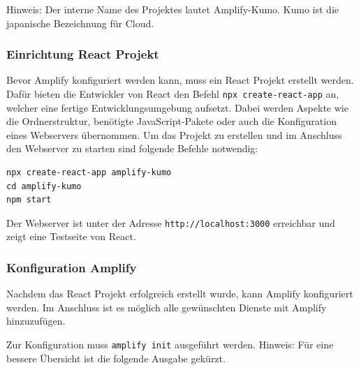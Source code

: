 Hinweis: Der interne Name des Projektes lautet Amplify-Kumo.
Kumo ist die japanische Bezeichnung für \glqq Cloud\grqq.


\subsubsection{Einrichtung React Projekt}

Bevor Amplify konfiguriert werden kann, muss ein React Projekt erstellt werden.
Dafür bieten die Entwickler von React den Befehl \verb+npx create-react-app+ an, welcher eine fertige Entwicklungsumgebung aufsetzt.
Dabei werden Aspekte wie die Ordnerstruktur, benötigte JavaScript-Pakete oder auch die Konfiguration eines Webservers übernommen.\cite[]{ReactNew}
Um das Projekt zu erstellen und im Anschluss den Webserver zu starten sind folgende Befehle notwendig:

\begin{lstlisting}[basicstyle=\ttfamily\small, breaklines=true , frame = single, backgroundcolor=\color{lavender} ]
npx create-react-app amplify-kumo
cd amplify-kumo
npm start
\end{lstlisting}

Der Webserver ist unter der Adresse \verb+http://localhost:3000+ erreichbar und zeigt eine Testseite von React.


\subsubsection{Konfiguration Amplify}

Nachdem das React Projekt erfolgreich erstellt wurde, kann Amplify konfiguriert werden.
Im Anschluss ist es möglich alle gewünschten Dienste mit Amplify hinzuzufügen.

Zur Konfiguration muss \verb+amplify init+ ausgeführt werden.
Hinweis: Für eine bessere Übersicht ist die folgende Ausgabe gekürzt.

